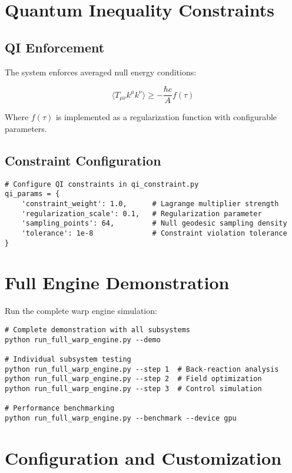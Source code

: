 \documentclass{article}
\begin{document}
\section{Quantum Inequality Constraints}

\subsection{QI Enforcement}

The system enforces averaged null energy conditions:

\begin{equation}
\langle T_{\mu\nu} k^\mu k^\nu \rangle \geq -\frac{\hbar c}{A} f(\tau)
\end{equation}

Where $f(\tau)$ is implemented as a regularization function with configurable parameters.

\subsection{Constraint Configuration}

\begin{lstlisting}
# Configure QI constraints in qi_constraint.py
qi_params = {
    'constraint_weight': 1.0,      # Lagrange multiplier strength
    'regularization_scale': 0.1,   # Regularization parameter
    'sampling_points': 64,         # Null geodesic sampling density
    'tolerance': 1e-8              # Constraint violation tolerance
}
\end{lstlisting}

\section{Full Engine Demonstration}

Run the complete warp engine simulation:

\begin{lstlisting}
# Complete demonstration with all subsystems
python run_full_warp_engine.py --demo

# Individual subsystem testing
python run_full_warp_engine.py --step 1  # Back-reaction analysis
python run_full_warp_engine.py --step 2  # Field optimization
python run_full_warp_engine.py --step 3  # Control simulation

# Performance benchmarking
python run_full_warp_engine.py --benchmark --device gpu
\end{lstlisting}

\section{Configuration and Customization}
\end{document}
